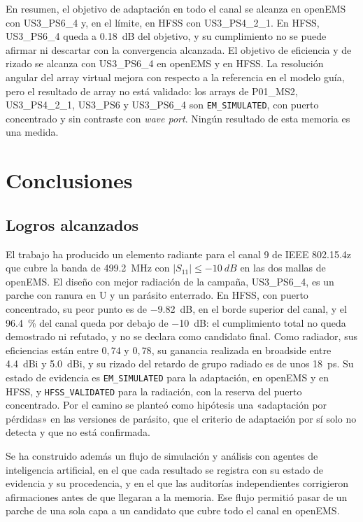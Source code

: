 \documentclass[11pt,a4paper]{article}
\begin{document}
En resumen, el objetivo de adaptación en todo el canal se alcanza en openEMS con US3\_PS6\_4 y, en el límite, en HFSS con US3\_PS4\_2\_1. En HFSS, US3\_PS6\_4 queda a \SI{0.18}{dB} del objetivo, y su cumplimiento no se puede afirmar ni descartar con la convergencia alcanzada. El objetivo de eficiencia y de rizado se alcanza con US3\_PS6\_4 en openEMS y en HFSS. La resolución angular del array virtual mejora con respecto a la referencia en el modelo guía, pero el resultado de array no está validado: los arrays de P01\_MS2, US3\_PS4\_2\_1, US3\_PS6 y US3\_PS6\_4 son \texttt{EM\_SIMULATED}, con puerto concentrado y sin contraste con \textit{wave port}. Ningún resultado de esta memoria es una medida.

\section{Conclusiones}\label{sec:conclusiones}
\subsection{Logros alcanzados}
El trabajo ha producido un elemento radiante para el canal 9 de IEEE 802.15.4z que cubre la banda de \SI{499.2}{MHz} con $|S_{11}| \le \SI{-10}{dB}$ en las dos mallas de openEMS. El diseño con mejor radiación de la campaña, US3\_PS6\_4, es un parche con ranura en U y un parásito enterrado. En HFSS, con puerto concentrado, su peor punto es de \SI{-9.82}{dB}, en el borde superior del canal, y el \SI{96.4}{\percent} del canal queda por debajo de \SI{-10}{dB}: el cumplimiento total no queda demostrado ni refutado, y no se declara como candidato final. Como radiador, sus eficiencias están entre $0{,}74$ y $0{,}78$, su ganancia realizada en broadside entre \SI{4.4}{dBi} y \SI{5.0}{dBi}, y su rizado del retardo de grupo radiado es de unos \SI{18}{ps}. Su estado de evidencia es \texttt{EM\_SIMULATED} para la adaptación, en openEMS y en HFSS, y \texttt{HFSS\_VALIDATED} para la radiación, con la reserva del puerto concentrado. Por el camino se planteó como hipótesis una «adaptación por pérdidas» en las versiones de parásito, que el criterio de adaptación por sí solo no detecta y que no está confirmada.

Se ha construido además un flujo de simulación y análisis con agentes de inteligencia artificial, en
el que cada resultado se registra con su estado de evidencia y su procedencia, y en el que las
auditorías independientes corrigieron afirmaciones antes de que llegaran a la memoria. Ese flujo
permitió pasar de un parche de una sola capa a un candidato que cubre todo el canal en openEMS.
\end{document}
